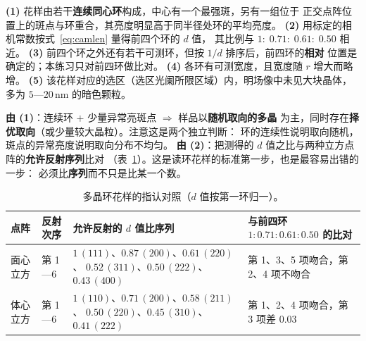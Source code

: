 \begin{obs}
\textbf{(1)} 花样由若干\textbf{连续同心环}构成，中心有一个最强斑，另有一组位于
正交点阵位置上的斑点与环重合，其亮度明显高于同半径处环的平均亮度。
\textbf{(2)} 用标定的相机常数按式~\eqref{eq:camlen} 量得前四个环的 $d$ 值，
其比例与 $1:\;0.71:\;0.61:\;0.50$ 相近。
\textbf{(3)} 前四个环之外还有若干可测环，但按 $1/d$ 排序后，前四环的\textbf{相对}
位置是确定的；本练习只对前四环做比对。
\textbf{(4)} 各环有可测宽度，且宽度随 $r$ 增大而略增。
\textbf{(5)} 该花样对应的选区（选区光阑所限区域）内，明场像中未见大块晶体，
多为 $5$—$20$\,nm 的暗色颗粒。
\end{obs}

\begin{infer}
\textbf{由 (1)}：连续环 $+$ 少量异常亮斑点 $\Rightarrow$ 样品以\textbf{随机取向的多晶}
为主，同时存在\textbf{择优取向}（或少量较大晶粒）。注意这是两个独立判断：
环的连续性说明取向随机，斑点的异常亮度说明取向分布不均匀。
\textbf{由 (2)}：把测得的 $d$ 值之比与两种立方点阵的\textbf{允许反射序列}比对
（表~\ref{tab:ring-index}）。这是读环花样的标准第一步，也是最容易出错的一步：
必须比\textbf{序列}而不只是比某一个数。

\begin{table}[htbp]
\centering
\caption{多晶环花样的指认对照（$d$ 值按第一环归一）。}
\label{tab:ring-index}
{\srcsize
\begin{tabularx}{\columnwidth}{@{}llXX@{}}
\toprule
点阵 & 反射次序 & 允许反射的 $d$ 值比序列 & 与前四环 $1:0.71:0.61:0.50$ 的比对 \\
\midrule
面心立方 & 第 1—6 & $1\,(111)$、$0.87\,(200)$、$0.61\,(220)$、%
$0.52\,(311)$、$0.50\,(222)$、$0.43\,(400)$ &
第 1、3、5 项吻合，第 2、4 项不吻合 \\
体心立方 & 第 1—6 & $1\,(110)$、$0.71\,(200)$、$0.58\,(211)$、%
$0.50\,(220)$、$0.45\,(310)$、$0.41\,(222)$ &
第 1、2、4 项吻合，第 3 项差 $0.03$ \\
\bottomrule
\end{tabularx}}
\end{table}


\end{infer}
